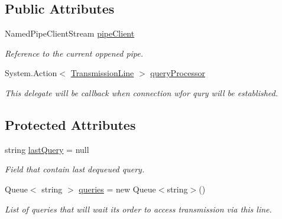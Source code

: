 \subsection*{Public Attributes}
\begin{DoxyCompactItemize}
\item 
Named\+Pipe\+Client\+Stream \mbox{\hyperlink{class_pipes_provider_1_1_transmission_line_a31dff9b14126dc47bfafe65e3c976c2f}{pipe\+Client}}
\begin{DoxyCompactList}\small\item\em Reference to the current oppened pipe. \end{DoxyCompactList}\item 
System.\+Action$<$ \mbox{\hyperlink{class_pipes_provider_1_1_transmission_line}{Transmission\+Line}} $>$ \mbox{\hyperlink{class_pipes_provider_1_1_transmission_line_a08bf6cb803ea32dd416afcc12ee866f5}{query\+Processor}}
\begin{DoxyCompactList}\small\item\em This delegate will be callback when connection wfor qury will be established. \end{DoxyCompactList}\end{DoxyCompactItemize}
\subsection*{Protected Attributes}
\begin{DoxyCompactItemize}
\item 
string \mbox{\hyperlink{class_pipes_provider_1_1_transmission_line_aaccd1f86aa1a894f8e0b2bbb00923413}{last\+Query}} = null
\begin{DoxyCompactList}\small\item\em Field that contain last dequeued query. \end{DoxyCompactList}\item 
Queue$<$ string $>$ \mbox{\hyperlink{class_pipes_provider_1_1_transmission_line_a81bbc79b91919db1098335cd547377ff}{queries}} = new Queue$<$string$>$()
\begin{DoxyCompactList}\small\item\em List of queries that will wait its order to access transmission via this line. \end{DoxyCompactList}\end{DoxyCompactItemize}
